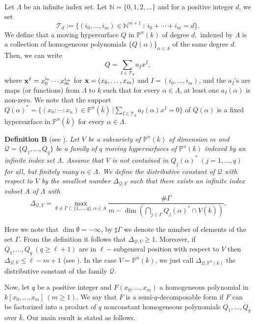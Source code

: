 \documentclass[12pt,leqno]{amsart}
\newcommand{\N}{\mathbb{N}}
\renewcommand{\P}{{\mathbb{P}}}
\numberwithin{equation}{section}
\begin{document}
Let $\Lambda$ be an infinite index set. Let $\N=\{0,1,2,\ldots\}$ and for a positive integer $d$, we set
$$\mathcal T_d :=\{(i_0,\ldots, i_m)\in\N^{m+1}\ :\ i_0+\cdots +i_m=d\}.$$
We define that a moving hypersurface $Q$ in $\P^n(k)$ of degree $d,$ indexed by $\Lambda$ is a collection of homogeneous polynomials $\{Q(\alpha)\}_{\alpha\in\Lambda}$ of the same degree $d$.
Then, we can write 
$$Q=\sum_{I\in\mathcal T_d}a_I x^I,$$ 
where ${\bf x}^I = x^{i_0}_0\cdots x^{i_m}_m$ for ${\bf x}=(x_0,\ldots, x_m)$ and $I = (i_0,\ldots,i_m)$, and the $a_I$'s are maps (or functions) from $\Lambda$ to $k$ such that for every $\alpha\in\Lambda$, at least one $a_I(\alpha)$ is non-zero. We note that the support $Q(\alpha)^*=\{(x_0:\cdots:x_n)\in \P^n(\bar k)\ | \sum_{I\in\mathcal T_d}a_I(\alpha)x^I=0\}$ of $Q(\alpha)$ is a fixed hypersurface in $\P^n(\bar k)$ for every $\alpha\in\Lambda$.

\vskip0.2cm
\noindent
{\bf Definition B} (see \cite[Definition 1.5]{CQT}). {\it Let $V$ be a subvariety of $\mathbb P^n(k)$ of dimension $m$ and $\mathcal Q=\{Q_{1}, \ldots, Q_{q}\}$ be a family of $q$ moving hypersurfaces of $\mathbb P^n(k)$ indexed by an infinite index set $\Lambda$. Assume that $V$ is not contained in $Q_j(\alpha)^*\; ( j=1,\dots, q)$ for all, but finitely many $\alpha\in\Lambda$. We define the distributive constant of $\mathcal Q$ with respect to $V$ by the smallest number $\Delta_{\mathcal Q,V}$ such that there exists an infinite index subset $A$ of $\Lambda$ with
$$\Delta_{\mathcal Q,V}=\max_{\emptyset\ne\Gamma\subset \{1,\dots, q\},\alpha\in A}\dfrac{\#\Gamma}{m-\dim(\bigcap_{j\in \Gamma}Q_j(\alpha)^*\cap V(\overline k))}.$$}

\vskip0.1cm
Here we note that $\dim\emptyset =-\infty$, by $\sharp\Gamma$ we denote the number of elements of the set $\Gamma$. 
From the definition it follows that $\Delta_{\mathcal Q,V}\ge 1$. Moreover, if $Q_1,\ldots,Q_q\ (q\geqslant \ell+1)$ are in $\ell-$subgeneral position with respect to $V$ then $\Delta_{\mathcal Q,V}\le\ell-m+1$ (see \cite{CQT}). In the case $V=\mathbb P^n(k)$, we just call $\Delta_{\mathcal Q,\mathbb P^n(k)}$ the distributive constant of the family $\mathcal Q$.

Now, let $q$ be a positive integer and $F\left(x_0, \ldots, x_m\right)$ a homogeneous polynomial in $k\left[x_0, \ldots, x_m\right]\ (m \geq 1)$. We say that $F$ is a semi-$q$-decomposable form if $F$ can be factorized into a product of $q$ nonconstant homogeneous polynomials $Q_1, \ldots, Q_q$ over $\bar{k}$.
Our main result is stated as follows.
\end{document}
